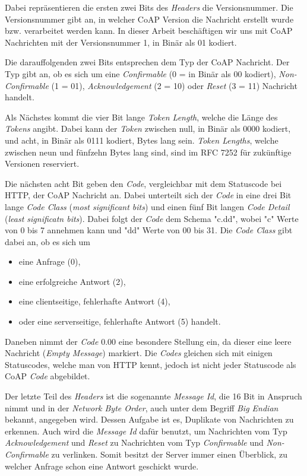 Dabei repräsentieren die ersten zwei Bits des \textit{Headers} die Versionsnummer. Die Versionsnummer gibt an, in welcher CoAP Version die Nachricht erstellt wurde bzw. verarbeitet werden kann. In dieser Arbeit beschäftigen wir uns mit CoAP Nachrichten mit der Versionsnummer 1, in Binär als 01 kodiert.

Die darauffolgenden zwei Bits entsprechen dem Typ der CoAP Nachricht. Der Typ gibt an, ob es sich um eine \textit{Confirmable} (0 = in Binär als 00 kodiert), \textit{Non-Confirmable} (1 = 01), \textit{Acknowledgement}  (2 = 10) oder \textit{Reset} (3 = 11) Nachricht handelt.

Als Nächstes kommt die vier Bit lange \textit{Token Length}, welche die Länge des \textit{Tokens} angibt. Dabei kann der \textit{Token} zwischen null, in Binär als 0000 kodiert, und acht, in Binär als 0111 kodiert, Bytes lang sein. \textit{Token Lengths}, welche zwischen neun und fünfzehn Bytes lang sind, sind im RFC 7252 \autocite{RFC7252} für zukünftige Versionen reserviert.

Die nächsten acht Bit geben den \textit{Code}, vergleichbar mit dem Statuscode bei HTTP, der CoAP Nachricht an. Dabei unterteilt sich der \textit{Code} in eine drei Bit lange \textit{Code Class} (\textit{most significant bits}) und einen fünf Bit langen \textit{Code Detail} (\textit{least significatn bits}). Dabei folgt der \textit{Code} dem Schema "c.dd", wobei "c" Werte von 0 bis 7 annehmen kann und "dd" Werte von 00 bis 31. Die \textit{Code Class} gibt dabei an, ob es sich um
\begin{itemize}
    \item eine Anfrage (0),
    \item eine erfolgreiche Antwort (2),
    \item eine clientseitige, fehlerhafte Antwort (4),
    \item oder eine serverseitige, fehlerhafte Antwort (5) handelt.
\end{itemize}

Daneben nimmt der \textit{Code} 0.00 eine besondere Stellung ein, da dieser eine leere Nachricht (\textit{Empty Message}) markiert. Die \textit{Codes} gleichen sich mit einigen Statuscodes, welche man von HTTP kennt, jedoch ist nicht jeder Statuscode als CoAP \textit{Code} abgebildet.

Der letzte Teil des \textit{Headers} ist die sogenannte \textit{Message Id}, die 16 Bit in Anspruch nimmt und in der \textit{Network Byte Order}, auch unter dem Begriff \textit{Big Endian} bekannt, angegeben wird. Dessen Aufgabe ist es, Duplikate von Nachrichten zu erkennen. Auch wird die \textit{Message Id} dafür benutzt, um Nachrichten vom Typ \textit{Acknowledgement} und \textit{Reset} zu Nachrichten vom Typ \textit{Confirmable} und \textit{Non-Confirmable} zu verlinken. Somit besitzt der Server immer einen Überblick, zu welcher Anfrage schon eine Antwort geschickt wurde.

